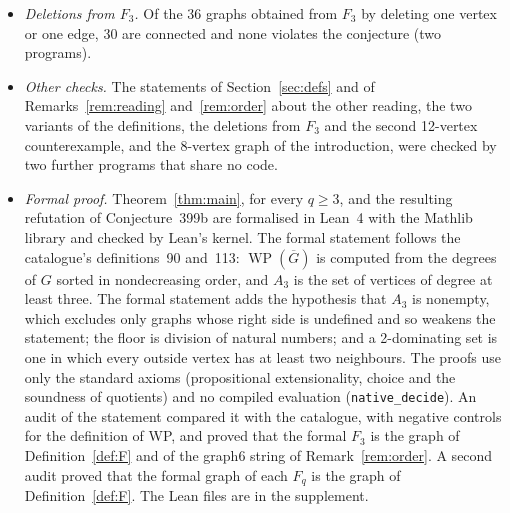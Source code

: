 \documentclass[11pt,a4paper]{article}
\theoremstyle{definition}
\theoremstyle{remark}
\newcommand{\Gc}{\overline{G}}
\newcommand{\WP}{\operatorname{WP}}
\begin{document}
\begin{itemize}
nonempty set of vertices of $H$. Two of the programs above list the connected graphs on
10 vertices, with the same result; their number, 11,716,571, is the known count of such graphs, so
the list is complete. Of these graphs, 255,261 satisfy $\gamma_2(H)\ge\WP(\overline{H})$. Two
programs that share no code evaluated all 261,132,003 ways of adding an eleventh vertex to them,
with identical results, and a third program rechecked every graph found and a random sample of
204,600 extensions. Exactly 3,022 connected graphs on 11 vertices, up to isomorphism, have
$\gamma_2=\WP(\Gc)+1$, and none of them has $\alpha(G[A_3])\ge 4$. A second search, written
separately for the first review of this paper, gave the same numbers.
\item \emph{Deletions from $F_3$.} Of the 36 graphs obtained from $F_3$ by deleting one vertex or
one edge, 30 are connected and none violates the conjecture (two programs).
\item \emph{Other checks.} The statements of Section~\ref{sec:defs} and of
Remarks~\ref{rem:reading} and~\ref{rem:order} about the other reading, the two variants of the
definitions, the deletions from $F_3$ and the second 12-vertex counterexample, and the 8-vertex
graph of the introduction, were checked by two further programs that share no code.
\item \emph{Formal proof.} Theorem~\ref{thm:main}, for every $q\ge 3$, and the resulting
refutation of Conjecture~399b are formalised in Lean~4 with the Mathlib library and checked by
Lean's kernel. The formal statement follows the catalogue's definitions~90 and~113: $\WP(\Gc)$ is
computed from the degrees of $G$ sorted in nondecreasing order, and $A_3$ is the set of vertices
of degree at least three. The formal statement adds the hypothesis that $A_3$ is nonempty, which
excludes only graphs whose right side is undefined and so weakens the statement; the floor is
division of natural numbers; and a 2-dominating set is one in which every outside vertex has at
least two neighbours. The proofs use only the standard axioms (propositional extensionality,
choice and the soundness of quotients) and no compiled evaluation (\texttt{native\_decide}). An
audit of the statement compared it with the catalogue, with negative controls for the definition
of WP, and proved that the formal $F_3$ is the graph of Definition~\ref{def:F} and of the graph6
string of Remark~\ref{rem:order}. A second audit proved that the formal graph of each $F_q$ is the
graph of Definition~\ref{def:F}. The Lean files are in the supplement.
\end{itemize}
\end{document}
